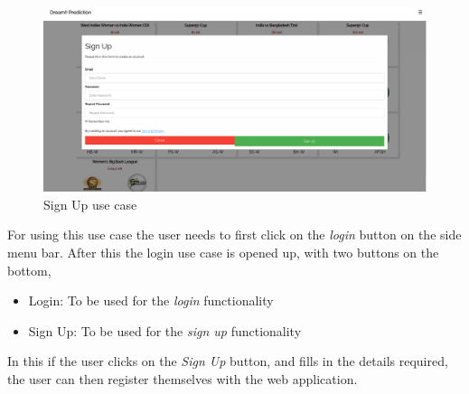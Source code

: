 \documentclass[12pt]{article}
\begin{document}
\begin{figure}[!h]
\begin{center}
    \includegraphics[scale=0.2]{signup.png}
\end{center}
    \caption{Sign Up use case}
\end{figure}
\par For using this use case the user needs to first click on the \textit{login} button on the side menu bar. After this the login use case is opened up, with two buttons on the bottom,
\begin{itemize}
    \item Login: To be used for the \textit{login} functionality
    \item Sign Up: To be used for the \textit{sign up} functionality
\end{itemize}
In this if the user clicks on the \textit{Sign Up} button, and fills in the details required, the user can then register themselves with the web application.
\end{document}
